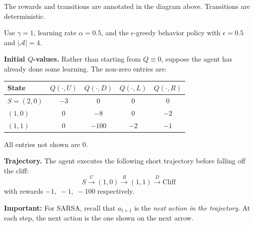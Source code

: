 \documentclass[12pt]{article}
\begin{document}
\noindent The rewards and transitions are annotated in the diagram above. Transitions are deterministic.

Use $\gamma = 1$, learning rate $\alpha = 0.5$, and the $\epsilon$-greedy behavior policy with $\epsilon = 0.5$ and $|\mathcal{A}|=4$.

\bigskip
\noindent\textbf{Initial $Q$-values.} Rather than starting from $Q\equiv 0$, suppose the agent has already done some learning. The non-zero entries are:

\begin{center}
\begin{tabular}{lcccc}
\toprule
State & $Q(\cdot, U)$ & $Q(\cdot, D)$ & $Q(\cdot, L)$ & $Q(\cdot, R)$ \\
\midrule
$S=(2,0)$ & $-3$ & $0$ & $0$ & $0$ \\
$(1,0)$   & $0$ & $-8$ & $0$ & $-2$ \\
$(1,1)$   & $0$ & $-100$ & $-2$ & $-1$ \\
\bottomrule
\end{tabular}
\end{center}

All entries not shown are $0$.

\bigskip
\noindent\textbf{Trajectory.} The agent executes the following short trajectory before falling off the cliff:
\[
S \xrightarrow{\;U\;} (1,0) \xrightarrow{\;R\;} (1,1) \xrightarrow{\;D\;} \text{Cliff} 
\]
with rewards $-1,\; -1,\; -100$ respectively. 

\textbf{Important:} For SARSA, recall that $a_{t+1}$ is the \emph{next action in the trajectory}. At each step, the next action is the one shown on the next arrow.

\bigskip
\end{document}
